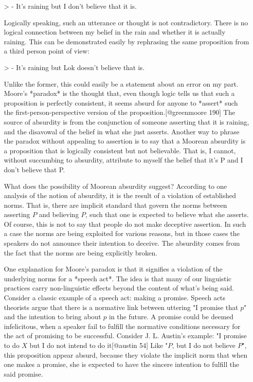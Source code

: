 \textgreater{} - It's raining but I don't believe that it is.

Logically speaking, such an utterance or thought is not contradictory.
There is no logical connection between my belief in the rain and whether
it is actually raining. This can be demonstrated easily by rephrasing
the same proposition from a third person point of view:

\textgreater{} - It's raining but Lok doesn't believe that is.

Unlike the former, this could easily be a statement about an error on my
part. Moore's *paradox* is the thought that, even though logic tells us
that such a proposition is perfectly consistent, it seems absurd for
anyone to *assert* such the first-person-perspective version of the
proposition.{[}@greenmoore 190{]} The source of absurdity is from the
conjunction of someone asserting that it is raining, and the disavowal
of the belief in what she just asserts. Another way to phrase the
paradox without appealing to assertion is to say that a Moorean
absurdity is a proposition that is logically consistent but not
believable. That is, I cannot, without succumbing to absurdity,
attribute to myself the belief that it's P and I don't believe that P.

What does the possibility of Moorean absurdity suggest? According to one
analysis of the notion of absurdity, it is the result of a violation of
established norms. That is, there are implicit standard that govern the
norms between asserting \(P\) and believing \(P\), such that one is
expected to believe what she asserts. Of course, this is not to say that
people do not make deceptive assertion. In such a case the norms are
being exploited for various reasons, but in those cases the speakers do
not announce their intention to deceive. The absurdity comes from the
fact that the norms are being explicitly broken.

One explanation for Moore's paradox is that it signifies a violation of
the underlying norms for a *speech act*. The idea is that many of our
linguistic practices carry non-linguistic effects beyond the content of
what's being said. Consider a classic example of a speech act: making a
promise. Speech acts theorists argue that there is a normative link
between uttering "I promise that \(p\)" and the intention to bring about
\(p\) in the future. A promise could be deemed infelicitous, when a
speaker fail to fulfill the normative conditions necessary for the act
of promising to be successful. Consider J. L. Austin's example: "I
promise to do \(X\) but I do not intend to do it{[}@austin 54{]} Like
"\(P\), but I do not believe \(P\)", this proposition appear absurd,
because they violate the implicit norm that when one makes a promise,
she is expected to have the sincere intention to fulfill the said
promise.

